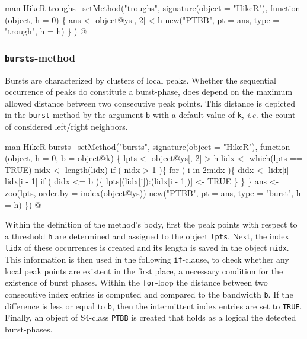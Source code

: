 \documentclass[a4paper]{article}
\begin{document}
\nwenddocs{}\endmoddef
\LA{}man-HikeR-troughs~{\nwtagstyle{}}\RA{}
setMethod("troughs",
    signature(object = "HikeR"),
    function (object, h = 0) \{
        ans <- object@ys[, 2] < h
        new("PTBB", pt = ans, type = "trough", h = h)
    \}
)
\nwendcode{}@

\subsubsection{\texttt{bursts}-method}
Bursts are characterized by clusters of local peaks. Whether the
sequential occurrence of peaks do constitute a burst-phase, does depend
on the maximum allowed distance between two consecutive peak
points. This distance is depicted in the \verb?burst?-method by the
argument \verb?b? with a default value of \verb?k?, \emph{i.e.} the count of
considered left/right neighbors.

\nwenddocs{}\endmoddef
\LA{}man-HikeR-bursts~{\nwtagstyle{}}\RA{}
setMethod("bursts",
    signature(object = "HikeR"),
    function (object, h = 0, b = object@k) \{
        lpts <- object@ys[, 2] > h
        lidx <- which(lpts == TRUE)
        nidx <- length(lidx)
        if ( nidx > 1 )\{
            for ( i in 2:nidx )\{
                didx <- lidx[i] - lidx[i - 1]
                if ( didx <= b )\{
                    lpts[(lidx[i]):(lidx[i - 1])] <- TRUE
                \}
            \}
        \}
        ans <- zoo(lpts, order.by = index(object@ys))
        new("PTBB", pt = ans, type = "burst", h = h)
\})
\nwendcode{}@

Within the definition of the method's body, first the peak points with
respect to a threshold \verb?h? are determined and assigned to the
object \verb?lpts?. Next, the index \verb?lidx? of these occurrences is
created and its length is saved in the object \verb?nidx?. This
information is then used in the following \verb?if?-clause, to check
whether any local peak points are existent in the first place, a
necessary condition for the existence of burst phases. Within the
\verb?for?-loop the distance between two consecutive index entries is
computed and compared to the bandwidth \verb?b?. If the difference is
less or equal to \verb?b?, then the intermittent index entries are set to
\verb?TRUE?. Finally, an object of S4-class \verb?PTBB? is created that
holds as a logical the detected burst-phases.
\end{document}
